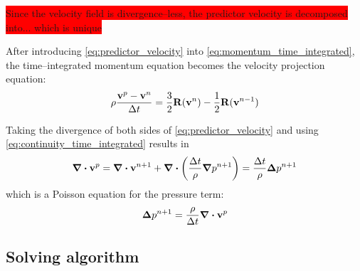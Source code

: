 \colorbox{red}{Since the velocity field is divergence--less, the predictor velocity is decomposed into... which is unique}

After introducing \eqref{eq:predictor_velocity} into \eqref{eq:momentum_time_integrated}, the time--integrated momentum equation becomes the velocity projection equation:
\begin{equation} \label{eq:momentum_time_integrated_predictor_velocity}
    \rho \frac{\vb{v}^p - \vb{v}^n}{\Delta t} = 
    \frac{3}{2} \vb{R}(\vb{v}^n) - \frac{1}{2} \vb{R}(\vb{v}^{n-1})
\end{equation}

Taking the divergence of both sides of \eqref{eq:predictor_velocity} and using \eqref{eq:continuity_time_integrated} results in
\begin{equation}
    \div{\vb{v}^p} = 
    \div{\vb{v}^{n+1}} + \div(\frac{\Delta t}{\rho} \grad{p}^{n+1}) = 
    \frac{\Delta t}{\rho} \boldsymbol\Delta{p^{n+1}}
\end{equation}
which is a Poisson equation for the pressure term:
\begin{equation} \label{eq:poisson_equation_pressure}
    \boldsymbol\Delta{p^{n+1}} = \frac{\rho}{\Delta t} \div{\vb{v}^p}
\end{equation}

\subsection{Solving algorithm}

